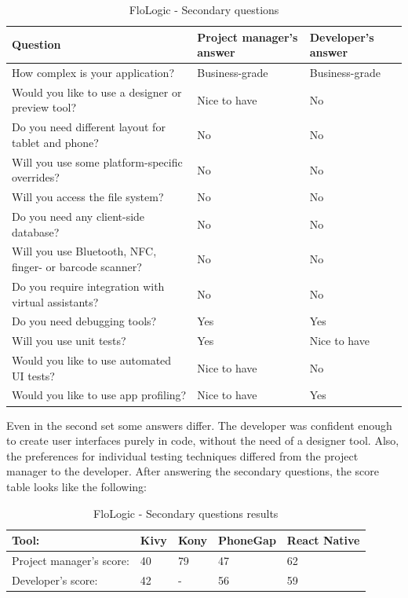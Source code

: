 \documentclass[english,master,public,dept460,male,cpdeclaration,oneside]{diploma}
\begin{document}
\begin{table}[!h]
	\centering
	\caption{FloLogic - Secondary questions}
	\begin{tabular}{p{5.5cm} | p{3.5cm} | p{3.5cm}}
		\toprule		
		\textbf{Question} &	\textbf{Project manager’s answer} & \textbf{Developer’s answer} \\
		\midrule
		How complex is your application? & Business-grade & Business-grade \\
		Would you like to use a designer or preview tool? & Nice to have & No \\
		Do you need different layout for tablet and phone? & No & No \\
		Will you use some platform-specific overrides? & No & No \\
		Will you access the file system? & No & No \\
		Do you need any client-side database? & No & No \\
		Will you use Bluetooth, NFC, finger- or barcode scanner? & No & No \\
		Do you require integration with virtual assistants? & No & No \\
		Do you need debugging tools? & Yes & Yes \\
		Will you use unit tests? & Yes & Nice to have \\
		Would you like to use automated UI tests? & Nice to have & No \\
		Would you like to use app profiling? & Nice to have & Yes \\		
		\midrule
	\end{tabular}
\end{table}

Even in the second set some answers differ. The developer was confident enough to create user interfaces purely in code, without the need of a designer tool. Also, the preferences for individual testing techniques differed from the project manager to the developer. After answering the secondary questions, the score table looks like the following:

\begin{table}[!h]
	\centering
	\caption{FloLogic - Secondary questions results}
	\begin{tabular}{p{4cm} | p{2cm} | p{2cm} | p{2cm} | p{2cm}}
		\toprule		
		\textbf{Tool:} & \textbf{Kivy} & \textbf{Kony} & \textbf{PhoneGap} & \textbf{React Native} \\
		\midrule		
		Project manager’s score: & 40 & 79 & 47 & 62 \\
		Developer’s score: & 42 & - & 56 & 59 \\
		\midrule
	\end{tabular}
\end{table}
\end{document}
